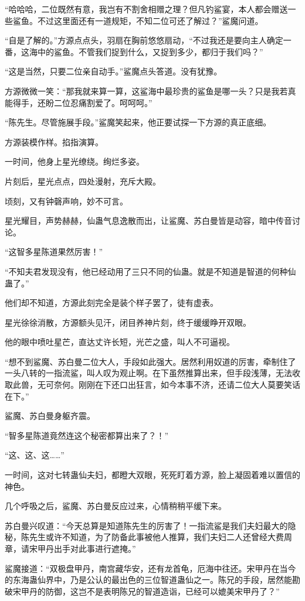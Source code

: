 \begin{this_body}
“哈哈哈，二位既然有意，我岂有不割舍相赠之理？但凡钓鲨宴，本人都会赠送一些鲨鱼。不过这里面还有一道规矩，不知二位可还了解过？”鲨魔问道。

“自是了解的。”方源点点头，羽扇在胸前悠悠扇动，“不过我还是要向主人确定一番，这海中的鲨鱼。不管我们捉到什么，又捉到多少，都归于我们吗？”

“这是当然，只要二位亲自动手。”鲨魔点头答道。没有犹豫。

方源微微一笑：“那我就来算一算，这鲨海中最珍贵的鲨鱼是哪一头？只是我若真能得手，还盼二位忍痛割爱了。呵呵呵。”

“陈先生。尽管施展手段。”鲨魔笑起来，他正要试探一下方源的真正底细。

方源装模作样。掐指演算。

一时间，他身上星光缭绕。绚烂多姿。

片刻后，星光点点，四处漫射，充斥大殿。

顷刻，又有钟磬声响，妙不可言。

星光耀目，声势赫赫，仙蛊气息逸散而出，让鲨魔、苏白曼皆是动容，暗中传音讨论。

“这智多星陈道果然厉害！”

“不知夫君发现没有，他已经动用了三只不同的仙蛊。就是不知道是智道的何种仙蛊了。”

他们却不知道，方源此刻完全是装个样子罢了，徒有虚表。

星光徐徐消散，方源额头见汗，闭目养神片刻，终于缓缓睁开双眼。

他的眼中喷吐星芒，直达丈许长短，光芒之盛，叫人不可逼视。

“想不到鲨魔、苏白曼二位大人，手段如此强大。居然利用奴道的厉害，牵制住了一头八转的一指流鲨，叫人叹为观止啊。在下虽然推算出来，但手段浅薄，无法收取此兽，无可奈何。刚刚在下还口出狂言，如今本事不济，还请二位大人莫要笑话在下。”

鲨魔、苏白曼身躯齐震。

“智多星陈道竟然连这个秘密都算出来了？！”

“这、这、这……”

一时间，这对七转蛊仙夫妇，都瞪大双眼，死死盯着方源，脸上凝固着难以置信的神色。

几个呼吸之后，鲨魔、苏白曼反应过来，心情稍稍平缓下来。

苏白曼兴叹道：“今天总算是知道陈先生的厉害了！一指流鲨是我们夫妇最大的隐秘，陈先生或许不知道，为了防备此事被他人推算，我们夫妇二人还曾经大费周章，请宋甲丹出手对此事进行遮掩。”

鲨魔接道：“双极盘甲丹，南宫藏华安，还有龙首龟，厄海中往还。宋甲丹在当今的东海蛊仙界中，乃是公认的最出色的三位智道蛊仙之一。陈兄的手段，居然能勘破宋甲丹的防御，这岂不是表明陈兄的智道造诣，已经可以媲美宋甲丹了？”


\end{this_body}

